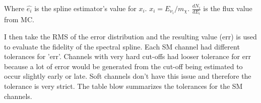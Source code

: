 Where $ \hat{e_i} $ is the spline estimator's value for $x_i$. $ x_i = E_{\nu_i} / m_\chi $. $ \frac{dN_i}{dE_i} $ is the flux value from MC.
\MSEspline

I then take the RMS of the error distribution and the resulting value (err) is used to evaluate the fidelity of the spectral spline.
Each SM channel had different tolerances for 'err'. Channels with very hard cut-offs had looser tolerance for err because a lot of error would be generated from the cut-off being estimated to occur slightly early or late.
Soft channels don't have this issue and therefore the tolerance is very strict.
The table blow summarizes the tolerances for the SM channels.


%
%
%
%
%
%
%
%
%
%
%
%
%

